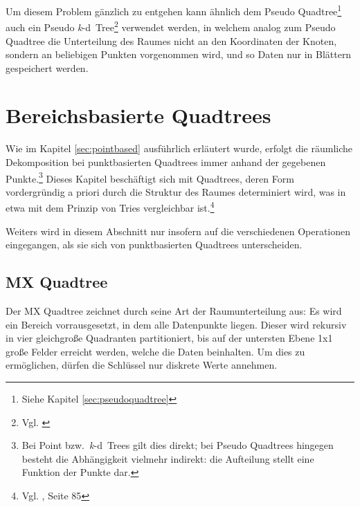 \documentclass[%
			paper=a4,%
			DIV12,
			liststotoc,
			bibtotoc,
			draft=false,%
			titlepage
			]{scrartcl}
\newcommand{\zit}[3]{#1 \cite{#2}, #3}
\newcommand{\zitx}[2]{#1 \cite{#2}}
\newcommand{\footzit}[3]{\footnote{\zit{#1}{#2}{#3}}}
\newcommand{\footzitx}[2]{\footnote{\zitx{#1}{#2}}}
\newcommand{\kd}{\mbox{\textit{k}-d}}
\begin{document}
Um diesem Problem gänzlich zu entgehen kann ähnlich dem Pseudo Quadtree\footnote{Siehe Kapitel \ref{sec:pseudoquadtree}} auch ein Pseudo \kd\ Tree\footzitx{Vgl.}{DBLP:journals/acta/OvermarsL82} verwendet werden,
in welchem analog zum Pseudo Quadtree die Unterteilung des Raumes nicht an den Koordinaten der Knoten, sondern an beliebigen Punkten vorgenommen wird, und so Daten nur in Blättern gespeichert werden.



\section{Bereichsbasierte Quadtrees}

Wie im Kapitel \ref{sec:pointbased} ausführlich erläutert wurde, erfolgt die räumliche Dekomposition bei punktbasierten Quadtrees immer anhand der gegebenen Punkte.\footnote{Bei Point bzw.\ \kd\ Trees gilt dies direkt; bei Pseudo Quadtrees hingegen besteht die Abhängigkeit vielmehr indirekt: die Aufteilung stellt eine Funktion der Punkte dar.}
Dieses Kapitel beschäftigt sich mit Quadtrees, deren Form vordergründig a priori durch die Struktur des Raumes determiniert wird, was in etwa mit dem Prinzip von Tries vergleichbar ist.\footzit{Vgl.}{Samet90}{Seite 85}

Weiters wird in diesem Abschnitt nur insofern auf die verschiedenen Operationen eingegangen, als sie sich von punktbasierten Quadtrees unterscheiden.

\subsection{MX Quadtree}
Der MX Quadtree zeichnet durch seine Art der Raumunterteilung aus:
Es wird ein Bereich vorrausgesetzt, in dem alle Datenpunkte liegen.
Dieser wird rekursiv in vier gleichgroße Quadranten partitioniert, bis auf der untersten Ebene 1x1 große Felder erreicht werden, welche die Daten beinhalten.
Um dies zu ermöglichen, dürfen die Schlüssel nur diskrete Werte annehmen.
\end{document}
